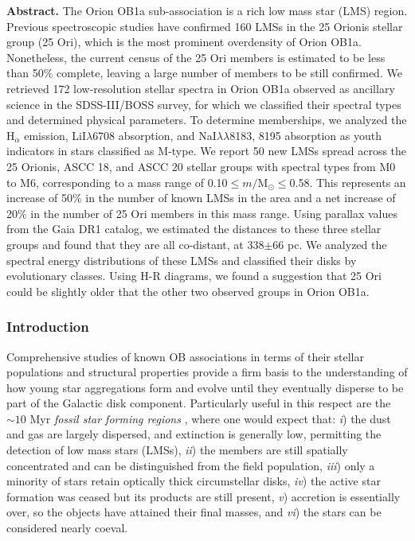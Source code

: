 \documentclass[12pt]{article}
\begin{document}

{\bf Abstract.}
The Orion OB1a sub-association is a rich low mass star (LMS) region. Previous spectroscopic studies have confirmed 160 LMSs in the 25 Orionis stellar group (25 Ori), which is the most prominent overdensity of Orion OB1a. Nonetheless, the current census of the 25 Ori members is estimated to be less than 50\% complete, leaving a large number of members to be still confirmed. We retrieved 172 low-resolution stellar spectra in Orion OB1a observed as ancillary science in the SDSS-III/BOSS survey, for which we classified their spectral types and determined physical parameters. To determine memberships, we analyzed the H$_\alpha$ emission, LiI$\lambda$6708 absorption, and NaI$\lambda\lambda$8183, 8195 absorption as youth indicators in stars classified as M-type. We report 50 new LMSs spread across the 25 Orionis, ASCC 18, and ASCC 20 stellar groups with spectral types from M0 to M6, corresponding to a mass range of 0.10$\le m/\textrm{M}_\odot \le$0.58. This represents an increase of 50\% in the number of known LMSs in the area and a net increase of 20\% in the number of 25 Ori members in this mass range. Using parallax values from the Gaia DR1 catalog, we estimated the distances to these three stellar groups and found that they are all co-distant, at 338$\pm$66 pc. We analyzed the spectral energy distributions of these LMSs and classified their disks by evolutionary classes. Using H-R diagrams, we found a suggestion that 25 Ori could be slightly older that the other two observed groups in Orion OB1a.

\subsubsection{Introduction}
\label{sec_BOSS:intro}
Comprehensive studies of known OB associations in terms of their stellar populations and structural properties provide a firm basis to the understanding of how young star aggregations form and evolve until they eventually disperse to be part of the Galactic disk component. Particularly useful in this respect are the $\sim 10$ Myr {\it fossil star forming regions} \citep[FSFRs; ][]{Blaauw1991}, where one would expect that: \textit{i}) the dust and gas are largely dispersed, and extinction is generally low, permitting the detection of low mass stars (LMSs), \textit{ii}) the members are still spatially concentrated and can be distinguished from the field population, \textit{iii}) only a minority of stars retain optically thick circumstellar disks, \textit{iv}) the active star formation was ceased but its products are still present, \textit{v}) accretion is essentially over, so the objects have attained their final masses, and \textit{vi}) the stars can be considered nearly coeval.
\end{document}
